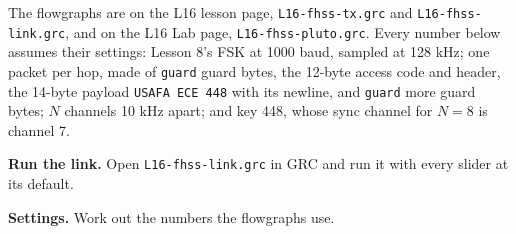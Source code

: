 \documentclass{exam}
\makeatletter
\def\keysol#1{\ifcsname keysol@#1\endcsname\csname keysol@#1\endcsname\fi}
\makeatother
\begin{document}
The flowgraphs are on the L16 lesson page, \texttt{L16-fhss-tx.grc} and
\texttt{L16-fhss-link.grc}, and on the L16 Lab page, \texttt{L16-fhss-pluto.grc}. Every
number below assumes their settings: Lesson 8's FSK at 1000 baud, sampled at 128 kHz;
one packet per hop, made of \texttt{guard} guard bytes, the 12-byte access code and
header, the 14-byte payload \texttt{USAFA ECE 448} with its newline, and
\texttt{guard} more guard bytes; $N$ channels 10 kHz apart; and key 448, whose sync
channel for $N = 8$ is channel 7.

\begin{questions}


\question \textbf{Run the link.} Open \texttt{L16-fhss-link.grc} in GRC and run it
with every slider at its default.


\newpage
\question \textbf{Settings.} Work out the numbers the flowgraphs use.

\begin{parts}


\end{parts}
\end{questions}
\end{document}
